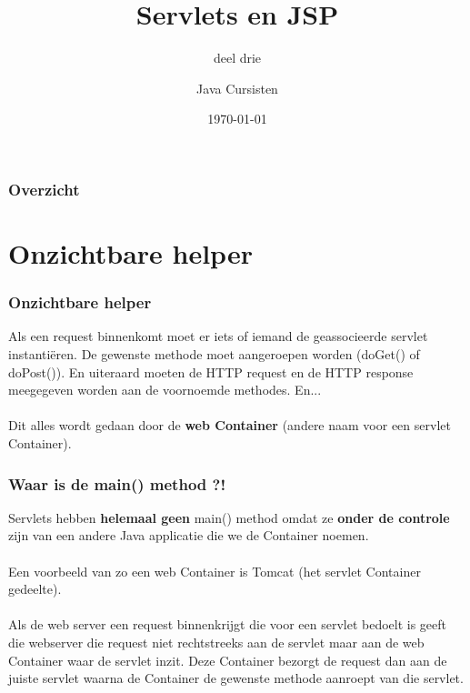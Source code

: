 \documentclass{beamer}
\title{Servlets en JSP}
\subtitle{deel drie}
\author{Java Cursisten}
\institute{INTEC Brussel}
\date{\today}
\begin{document}
\begin{frame}

\titlepage

\end{frame}

\begin{frame}

\frametitle{Overzicht}
{\LARGE \tableofcontents}

\end{frame}


\section{Onzichtbare helper}


\begin{frame}

\frametitle{Onzichtbare helper}

Als een request binnenkomt moet er iets of iemand de geassocieerde servlet instanti\"eren. De gewenste methode moet aangeroepen worden (doGet() of doPost()). En uiteraard moeten de HTTP request en de HTTP response meegegeven worden aan de voornoemde methodes. En...\\~\\

Dit alles wordt gedaan door de {\LARGE \textbf{web Container}} (andere naam voor een servlet Container). 

\end{frame}


\begin{frame}

\frametitle{Waar is de main() method ?!}

{\Large Servlets hebben \textbf{helemaal geen} main() method omdat ze \textbf{onder de
controle} zijn van een andere Java applicatie die we de Container noemen.\\~\\

Een voorbeeld van zo een web Container is Tomcat (het servlet Container gedeelte).\\~\\

Als de web server een request binnenkrijgt die voor een servlet bedoelt is geeft
die webserver die request niet rechtstreeks aan de servlet maar aan de web Container waar de servlet inzit. Deze Container bezorgt de request dan aan de juiste servlet waarna de Container de gewenste methode aanroept van die servlet. }

\end{frame}
\end{document}
